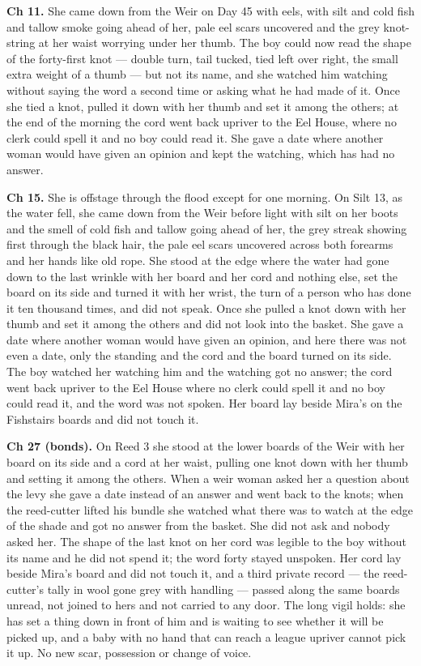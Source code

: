 \documentclass{design/chronicle}
\begin{document}
{\textbf{Ch 11.} She came down from the Weir on Day 45 with eels, with silt and cold fish and tallow smoke going ahead of her, pale eel scars uncovered and the grey knot-string at her waist worrying under her thumb. The boy could now read the shape of the forty-first knot --- double turn, tail tucked, tied left over right, the small extra weight of a thumb --- but not its name, and she watched him watching without saying the word a second time or asking what he had made of it. Once she tied a knot, pulled it down with her thumb and set it among the others; at the end of the morning the cord went back upriver to the Eel House, where no clerk could spell it and no boy could read it. She gave a date where another woman would have given an opinion and kept the watching, which has had no answer.

\textbf{Ch 15.} She is offstage through the flood except for one morning. On Silt 13, as the water fell, she came down from the Weir before light with silt on her boots and the smell of cold fish and tallow going ahead of her, the grey streak showing first through the black hair, the pale eel scars uncovered across both forearms and her hands like old rope. She stood at the edge where the water had gone down to the last wrinkle with her board and her cord and nothing else, set the board on its side and turned it with her wrist, the turn of a person who has done it ten thousand times, and did not speak. Once she pulled a knot down with her thumb and set it among the others and did not look into the basket. She gave a date where another woman would have given an opinion, and here there was not even a date, only the standing and the cord and the board turned on its side. The boy watched her watching him and the watching got no answer; the cord went back upriver to the Eel House where no clerk could spell it and no boy could read it, and the word was not spoken. Her board lay beside Mira’s on the Fishstairs boards and did not touch it.

\textbf{Ch 27 (bonds).} On Reed 3 she stood at the lower boards of the Weir with her board on its side and a cord at her waist, pulling one knot down with her thumb and setting it among the others. When a weir woman asked her a question about the levy she gave a date instead of an answer and went back to the knots; when the reed-cutter lifted his bundle she watched what there was to watch at the edge of the shade and got no answer from the basket. She did not ask and nobody asked her. The shape of the last knot on her cord was legible to the boy without its name and he did not spend it; the word forty stayed unspoken. Her cord lay beside Mira’s board and did not touch it, and a third private record — the reed-cutter’s tally in wool gone grey with handling — passed along the same boards unread, not joined to hers and not carried to any door. The long vigil holds: she has set a thing down in front of him and is waiting to see whether it will be picked up, and a baby with no hand that can reach a league upriver cannot pick it up. No new scar, possession or change of voice.

}
\end{document}
